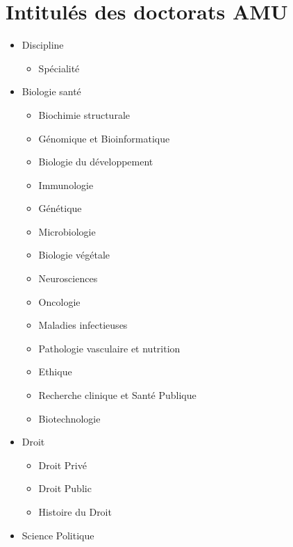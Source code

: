 \chapter{Intitulés des doctorats AMU}
\label{chap:doctorats}

		\begin{itemize}
		\item Discipline
			\begin{itemize}
			\item Spécialité
			\end{itemize}
		\end{itemize}
		
	\label{ed-62-sciences-de-la-vie-et-de-la-sante}

		\begin{itemize}
		\item Biologie santé
			\begin{itemize}
			\item Biochimie structurale
			\item Génomique et  Bioinformatique
			\item Biologie du développement
			\item Immunologie
			\item Génétique
			\item Microbiologie
			\item Biologie végétale
			\item Neurosciences
			\item Oncologie
			\item Maladies infectieuses
			\item Pathologie vasculaire et nutrition
			\item Ethique
			\item Recherche clinique et Santé Publique
			\item Biotechnologie
			\end{itemize}
		\end{itemize}

	\label{ed-67-sciences-juridiques-et-politiques}

		\begin{itemize}
		\item Droit
			\begin{itemize}
			\item Droit Privé
			\item Droit Public
			\item Histoire du Droit
			\end{itemize}
		\item Science Politique
		\end{itemize}

